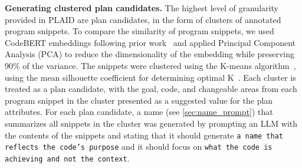 \textbf{Generating clustered plan candidates.}
\label{sec:clustering}
The highest level of granularity provided in PLAID
are
plan candidates, in the form of clusters of annotated program snippets. To compare the similarity of program snippets, we used CodeBERT embeddings following prior work~\cite{codebert} and applied Principal Component Analysis (PCA) \cite{PCAanalysis} to reduce the dimensionality of the embedding while preserving 90\% of the variance. The snippets were clustered using the K-means algorithm~\cite{kmeansclustering}, using the mean silhouette coefficient for determining optimal K~\cite{silhouettecoeff}. Each cluster is treated as a plan candidate, with the goal, code, and changeable areas from each program snippet in the cluster presented as a suggested value for the plan attributes.
For each plan candidate, a name (see \cref{sec:name_prompt}) that summarizes all snippets in the cluster was generated by prompting an LLM with the contents of the snippets and stating that it should generate \texttt{a name that reflects the code's purpose} and it should focus on \texttt{what the code is achieving and not the context}. 


